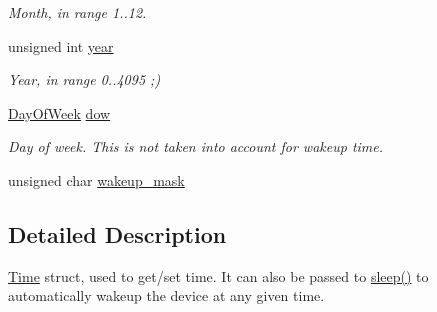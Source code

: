 \begin{DoxyCompactItemize}
\begin{DoxyCompactList}\small\item\em Month, in range 1..12. \end{DoxyCompactList}\item 
\hypertarget{structmiosix_1_1_time_a28a4595cab58ff297e79affa464492c0}{unsigned int \hyperlink{structmiosix_1_1_time_a28a4595cab58ff297e79affa464492c0}{year}}\label{structmiosix_1_1_time_a28a4595cab58ff297e79affa464492c0}

\begin{DoxyCompactList}\small\item\em Year, in range 0..4095 ;) \end{DoxyCompactList}\item 
\hypertarget{structmiosix_1_1_time_aacbdf35ea594010eb1febd8df080ebfa}{\hyperlink{group___hardware_ga24027ab4dbf8557211c0a82fb0dffcbf}{Day\-Of\-Week} \hyperlink{structmiosix_1_1_time_aacbdf35ea594010eb1febd8df080ebfa}{dow}}\label{structmiosix_1_1_time_aacbdf35ea594010eb1febd8df080ebfa}

\begin{DoxyCompactList}\small\item\em Day of week. This is not taken into account for wakeup time. \end{DoxyCompactList}\item 
unsigned char \hyperlink{structmiosix_1_1_time_a3673fc828b66c204ab68cf1a1fb1020a}{wakeup\-\_\-mask}
\end{DoxyCompactItemize}


\subsection{Detailed Description}
\hyperlink{structmiosix_1_1_time}{Time} struct, used to get/set time. It can also be passed to \hyperlink{group___hardware_ga030255d7e5175ed1ab2c4ce48276ef23}{sleep()} to automatically wakeup the device at any given time. 

